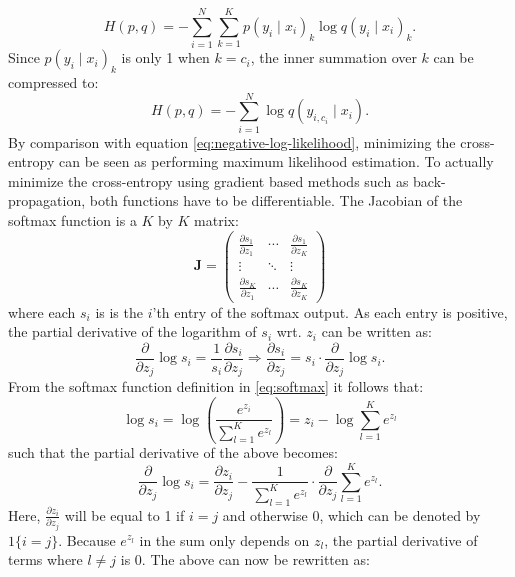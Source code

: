 \documentclass[a4paper,11pt]{article} %
\begin{document}
\begin{equation}
  H(p, q) = - \sum_{i=1}^N \sum_{k=1}^K p(y_i \mid x_i)_k \log q(y_i \mid x_i)_k.
\end{equation}
Since $p(y_i \mid x_i)_k$ is only 1 when $k=c_i$, the inner summation over $k$ can be compressed to:
\begin{equation}
  H(p, q) = - \sum_{i=1}^N \log q(y_{i,c_i} \mid x_i).
\end{equation}
By comparison with equation \ref{eq:negative-log-likelihood}, minimizing the cross-entropy can be seen as performing maximum likelihood estimation. To actually minimize the cross-entropy using gradient based methods such as back-propagation, both functions have to be differentiable. The Jacobian of the softmax function is a $K$ by $K$ matrix:
\begin{equation}
  \mathbf{J} = \left( 
    \begin{matrix}
      \frac{\partial s_1}{\partial z_1} & \cdots & \frac{\partial s_1}{\partial z_K}\\
      \vdots & \ddots & \vdots \\
      \frac{\partial s_K}{\partial z_1} & \cdots & \frac{\partial s_K}{\partial z_K}
    \end{matrix} 
  \right)
\end{equation}
where each $s_i$ is is the $i$'th entry of the softmax output. As each entry is positive, the partial derivative of the logarithm of $s_i$ wrt. $z_i$ can be written as:
\begin{equation} \label{eq:softmax-derivative}
  \frac{\partial}{\partial z_j} \log s_i = \frac{1}{s_i} \frac{\partial s_i}{\partial z_j}
  \Rightarrow \frac{\partial s_i}{\partial z_j} = s_i \cdot \frac{\partial}{\partial z_j} \log s_i.
\end{equation}
From the softmax function definition in \ref{eq:softmax} it follows that:
\begin{equation}
  \log s_i = \log \left( \frac{e^{z_i}}{\sum_{l=1}^{K}{e^{z_l}}}  \right) = z_i - \log  \sum_{l=1}^{K}{e^{z_l}}
\end{equation}
such that the partial derivative of the above becomes:
\begin{equation}
  \frac{\partial}{\partial z_j} \log s_i = \frac{\partial z_i}{\partial z_j} - \frac{1}{\sum_{l=1}^{K}{e^{z_l}}} \cdot \frac{\partial}{\partial z_j} \sum_{l=1}^{K}{ e^{z_l}}.
\end{equation}
Here, $\frac{\partial z_i}{\partial z_j}$ will be equal to 1 if $i=j$ and otherwise 0, which can be denoted by $1\{i = j\}$. Because $e^{z_l}$ in the sum only depends on $z_l$, the partial derivative of terms where $l\neq j$ is 0. The above can now be rewritten as:
\end{document}
